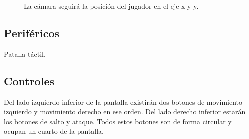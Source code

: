 \documentclass[11pt,letterpaper]{article}
\begin{document}
\begin{figure}
  \centering
  \caption{La cámara seguirá la posición del jugador en el eje x y y.}
  \label{fig:Camara}
\end{figure} 
	\subsection{Periféricos}
	Patalla táctil.
	\subsection{Controles}
	Del lado izquierdo inferior de la pantalla existirán dos botones de movimiento izquierdo y movimiento derecho en ese orden. Del lado derecho inferior estarán los botones de salto y ataque. Todos estos botones son de forma circular y ocupan un cuarto de la pantalla.
\end{document}

